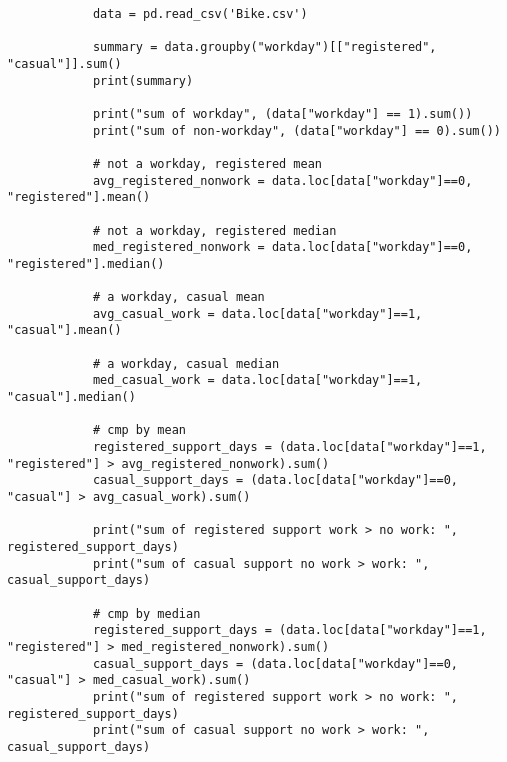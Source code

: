 \documentclass[12pt,a4paper]{article}
\begin{document}
\begin{enumerate}
\begin{enumerate}
\begin{verbatim}
            data = pd.read_csv('Bike.csv')

            summary = data.groupby("workday")[["registered", "casual"]].sum()
            print(summary)

            print("sum of workday", (data["workday"] == 1).sum())
            print("sum of non-workday", (data["workday"] == 0).sum())

            # not a workday, registered mean
            avg_registered_nonwork = data.loc[data["workday"]==0, "registered"].mean()

            # not a workday, registered median
            med_registered_nonwork = data.loc[data["workday"]==0, "registered"].median()

            # a workday, casual mean
            avg_casual_work = data.loc[data["workday"]==1, "casual"].mean()

            # a workday, casual median
            med_casual_work = data.loc[data["workday"]==1, "casual"].median()

            # cmp by mean
            registered_support_days = (data.loc[data["workday"]==1, "registered"] > avg_registered_nonwork).sum()
            casual_support_days = (data.loc[data["workday"]==0, "casual"] > avg_casual_work).sum()

            print("sum of registered support work > no work: ", registered_support_days)
            print("sum of casual support no work > work: ", casual_support_days)

            # cmp by median
            registered_support_days = (data.loc[data["workday"]==1, "registered"] > med_registered_nonwork).sum()
            casual_support_days = (data.loc[data["workday"]==0, "casual"] > med_casual_work).sum()
            print("sum of registered support work > no work: ", registered_support_days)
            print("sum of casual support no work > work: ", casual_support_days)
        \end{verbatim}


\end{enumerate}
\end{enumerate}
\end{document}
